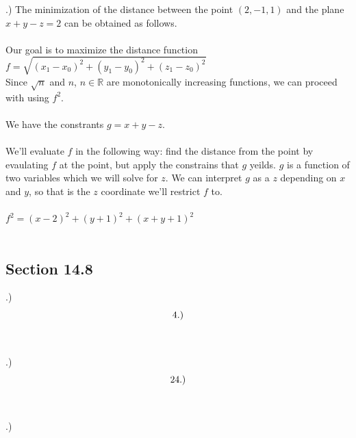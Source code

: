 \documentclass[12pt]{article}
\begin{document}
.) The minimization of the distance between the point $(2, -1, 1)$ and the plane $x+y-z = 2$ can be obtained as follows.\\\\
\noindent Our goal is to maximize the distance function $f = \sqrt{(x_{1} - x_{0})^{2} + (y_{1} - y_{0})^{2} + (z_{1} - z_{0})^{2}}$\\
\noindent Since $\sqrt{n}$ and $n$, $n \in \mathbb{R}$ are monotonically increasing functions, we can proceed with using $f^{2}$.\\\\
\noindent We have the constrants $g = x+y-z$.\\\\
\noindent We'll evaluate $f$ in the following way: find the distance from the point by evaulating $f$ at the point, but apply the constrains 
that $g$ yeilds. $g$ is a function of two variables which we will solve for $z$. We can interpret $g$ as a $z$ depending on $x$ and $y$, so 
that is the $z$ coordinate we'll restrict $f$ to.\\\\
\noindent $f^{2} = (x-2)^{2} + (y+1)^{2} + (x + y +1)^{2}$\\\\
\noindent  


\subsection*{Section 14.8}
.) $$\\\\
\noindent 4.) $$\\\\
.) $$\\\\
\noindent 24.) $$\\\\
.) $$\\\\
\end{document}
